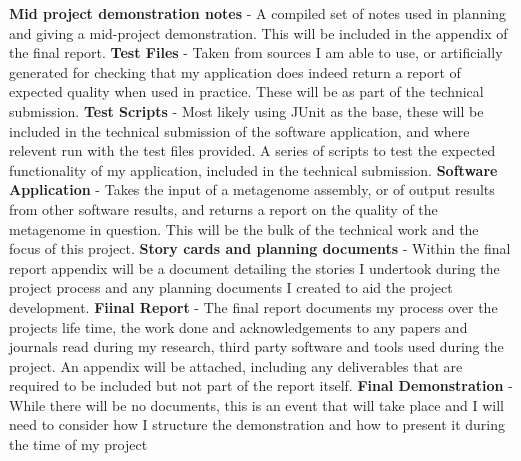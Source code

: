 \documentclass[11pt,fleqn,twoside]{article}
\begin{document}
\textbf{Mid project demonstration notes} - A compiled set of notes used in planning and giving a mid-project demonstration. This will be included in the appendix of the final report.
\newline
\noindent
\textbf{Test Files} - Taken from sources I am able to use, or artificially generated for checking that my application does indeed return a report of expected quality when used in practice. These will be as part of the technical submission.
\newline
\noindent
\textbf{Test Scripts} - Most likely using JUnit as the base, these will be included in the technical submission of the software application, and where relevent run with the test files provided. A series of scripts to test the expected functionality of my application, included in the technical submission.
\newline
\noindent
\textbf{Software Application} - Takes the input of a metagenome assembly, or of output results from other software results, and returns a report on the quality of the metagenome in question. This will be the bulk of the technical work and the focus of this project.
\newline
\noindent
\textbf{Story cards and planning documents} - Within the final report appendix will be a document detailing the stories I undertook during the project process and any planning documents I created to aid the project development.
\newline
\noindent
\textbf{Fiinal Report} -  The final report documents my process over the projects life time, the work done and acknowledgements to any papers and journals read during my research, third party software and tools used during the project. An appendix will be attached, including any deliverables that are required to be included but not part of the report itself.
\newline
\noindent
\textbf{Final Demonstration} - While there will be no documents, this is an event that will take place and I will need to consider how I structure the demonstration and how to present it during the time of my project

%
%
%
\end{document}
